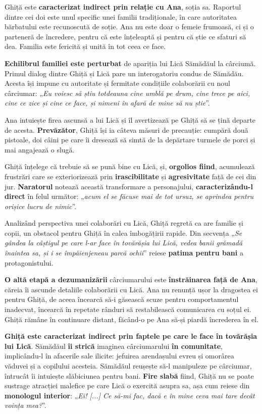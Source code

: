 \documentclass{article}
\newcommand{\qu}[1]{„\emph{#1}”}
\begin{document}
Ghiță este \textbf{caracterizat indirect prin relație cu Ana}, soția sa. Raportul dintre cei doi este unul specific unei familii tradiționale, în care autoritatea bărbatului este recunoscută de soție. Ana nu este doar o femeie frumoasă, ci și o parteneră de încredere, pentru că este înțeleaptă și pentru că știe ce sfaturi să dea. Familia este fericită și unită în tot ceea ce face.

\textbf{Echilibrul familiei este perturbat} de apariția lui Lică Sămădăul la cârciumă. Primul dialog dintre Ghiță și Lică pare un interogatoriu condus de Sămădău. Acesta își impune cu autoritate și fermitate condițiile colaborării cu noul cârciumar: \qu{Eu voiesc să știu totdeauna cine umblă pe drum, cine trece pe aici, cine ce zice și cine ce face, și nimeni în afară de mine să nu știe}.

Ana intuiește firea ascunsă a lui Lică și îl avertizează pe Ghiță să se țină departe de acesta. \textbf{Prevă\-zător}, Ghiță își ia câteva măsuri de precauție: cumpără două pistoale, doi câini pe care îi dresează să simtă de la depărtare turmele de porci și mai angajează o slugă.

Ghiță înțelege că trebuie să se pună bine cu Lică, și, \textbf{orgolios fiind}, acumulează frustrări care se exteriorizează prin \textbf{irascibilitate} și \textbf{agresivitate} față de cei din jur. \textbf{Naratorul} notează această transformare a personajului, \textbf{caracterizându-l direct} în felul următor: \qu{acum el se făcuse mai de tot ursuz, se aprindea pentru orișice lucru de nimic}.

Analizând perspectiva unei colaborări cu Lică, Ghiță regretă ca are familie și copii, un obstacol pentru Ghiță în calea îmbogățirii rapide. Din secvența \qu{Se gândea la câștigul pe care l-ar face în tovărășia lui Lică, vedea banii grămadă înaintea sa, și i se împăienjeneau parcă ochii} reiese \textbf{patima pentru bani} a protagonistului.

\textbf{O altă etapă a dezumanizării} cârciumarului este \textbf{înstrăinarea față de Ana}, căreia îi ascunde detaliile colaborării cu Lică. Ana nu renunță ușor la dragostea ei pentru Ghiță, de aceea încearcă să-i găsească scuze pentru comportamentul inadecvat, încearcă în repetate rânduri să restabilească comunicarea cu soțul ei. Ghiță rămâne în continuare distant, făcând-o pe Ana să-și piardă încrederea în el.

\textbf{Ghiță este caracterizat indirect prin faptele pe care le face în tovărășia lui Lică}. Sămădăul \textbf{îi strică} imaginea cârciumarului \textbf{în comunitate}, implicându-l în afacerile sale ilicite: jefuirea arendașului evreu și omorârea văduvei și a copilului acesteia. Sămădăul reușește să-l manipuleze pe cârciumar, întrucât îi intuiește slăbiciunea pentru bani. \textbf{Fire slabă} fiind, Ghiță nu se poate sustrage atracției malefice pe care Lică o exercită asupra sa, așa cum reiese din \textbf{monologul interior}: \qu{Ei! [...] Ce să-mi fac, dacă e în mine ceva mai tare decât voința mea?}.
\end{document}
